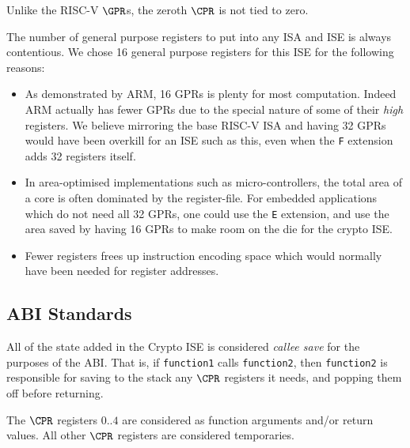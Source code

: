 Unlike the RISC-V $\GPR$s, the zeroth $\CPR$ is not tied to zero.


The number of general purpose registers to put into any ISA and ISE is
always contentious. We chose 16 general purpose registers for this ISE
for the following reasons:
\begin{itemize}
\item As demonstrated by ARM, 16 GPRs is plenty for most computation. Indeed
ARM actually has fewer GPRs due to the special nature of some of their
{\em high} registers. We believe mirroring the base RISC-V ISA and having
32 GPRs would have been overkill for an ISE such as this, even when the
{\tt F} extension adds 32 registers itself.
\item In area-optimised implementations such as micro-controllers, the
total area of a core is often dominated by the register-file. For embedded
applications which do not need all 32 GPRs, one could use the {\tt E}
extension, and use the area saved by having 16 GPRs to make room on the die
for the crypto ISE.
\item Fewer registers frees up instruction encoding space which would
normally have been needed for register addresses.
\end{itemize}

\subsection{ABI Standards}

All of the state added in the Crypto ISE is considered {\em callee save}
for the purposes of the ABI. That is, if {\tt function1} calls 
{\tt function2}, then {\tt function2} is responsible for saving to the
stack any $\CPR$ registers it needs, and popping them off before returning.

The $\CPR$ registers $0..4$ are considered as function arguments
and/or return values. 
All other $\CPR$ registers are considered temporaries.


